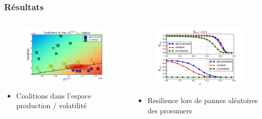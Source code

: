 \documentclass[xcolor=dvipsnames]{beamer}
\begin{document}
%
%
\begin{frame}
	\frametitle{Résultats}

	\begin{columns}
		\begin{column}{.5\textwidth}
			\begin{figure}
				\includegraphics[width=6cm]{coalitions6.pdf}
			\end{figure}
			\begin{itemize}
				\item Coalitions dans l'espace production / volatilité
			\end{itemize}
		\end{column}
		\begin{column}{.5\textwidth}
			\begin{figure}
				\includegraphics[width=6cm]{resilience_both.pdf}
			\end{figure}	
			\begin{itemize}
				\item Resilience lors de pannes aléatoires des prosumers
			\end{itemize}
		\end{column}
	\end{columns}
\end{frame}
\end{document}
